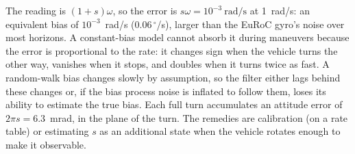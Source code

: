 \begin{solutions}
  \item The reading is $(1 + s)\omega$, so the error is $s\omega = 10^{-3}~\mathrm{rad/s}$ at 1~rad/s: an equivalent bias of $10^{-3}$~rad/s ($0.06\,^\circ$/s), larger than the
        EuRoC gyro's noise over most horizons. A constant-bias model cannot absorb it during maneuvers because the error is proportional to the rate:
        it changes sign when the vehicle turns the other way, vanishes when it stops, and doubles when it turns twice as fast. A random-walk bias
        changes slowly by assumption, so the filter either lags behind these changes or, if the bias process noise is inflated to follow them,
        loses its ability to estimate the true bias. Each full turn accumulates an attitude error of $2\pi s = 6.3$~mrad, in the plane of the turn. The
        remedies are calibration (on a rate table) or estimating $s$ as an additional state when the vehicle rotates enough to make it observable.
\end{solutions}
